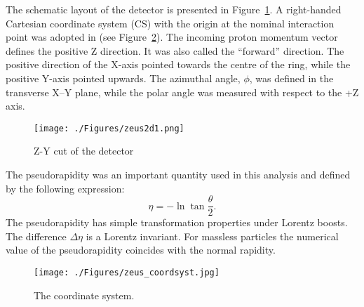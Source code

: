 The schematic layout of the \zeus detector is presented in Figure~\ref{fig:zeus2d1}. A right-handed Cartesian coordinate system (CS) with the origin at the nominal interaction point was adopted in \zeus (see Figure~\ref{fig:zeus_coordsyst}). The incoming proton momentum vector defines the positive Z direction. It was also called the ``forward'' direction. The positive direction of the X-axis pointed towards the centre of the \hera ring, while the positive Y-axis pointed upwards. The azimuthal angle, $\phi$, was defined in the transverse X--Y plane, while the polar angle was measured with respect to the +Z axis. 
\begin{landscape}
\begin{figure}[htpb]
	\centering
		\texttt{[image: ./Figures/zeus2d1.png]}
	\caption{Z-Y cut of the \zeus detector}
	\label{fig:zeus2d1}
\end{figure}
\end{landscape}

The pseudorapidity was an important quantity used in this analysis and defined by the following expression:
\begin{equation}
\eta = -\ln \tan \dfrac{\theta}{2}.
\end{equation}
The pseudorapidity has simple transformation properties under Lorentz boosts. The difference $\Delta \eta$ is a Lorentz invariant. For massless particles the numerical value of the pseudorapidity coincides with the normal rapidity.
\begin{figure}[htpb]
	\centering
		\texttt{[image: ./Figures/zeus\_coordsyst.jpg]}
	\caption{The \zeus coordinate system.}
	\label{fig:zeus_coordsyst}
\end{figure}
